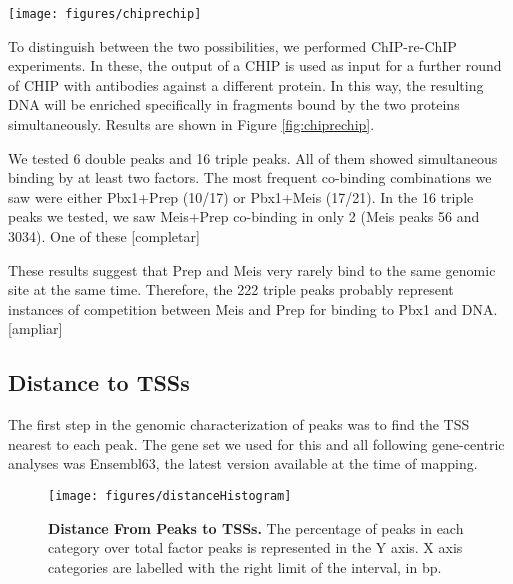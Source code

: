 \begin{SCfigure}[]
  \centering
  \texttt{[image: figures/chiprechip]}
  \caption[ChIP-re-ChIP experiments]{\textbf{ChIP-re-ChIP experiments.} Factors were subjected to succesive round of \ac{CHIP} with antibodies with different specificities, as indicated. Unspecific antibody (IgG) was used as a negative control. Purified DNA was amplified in a rate-limiting \ac{PCR} to obtain an amount of product roughly proportional to the peak DNA present. Band intensities over IgG band were considered as positive signals.}
  \label{fig:chiprechip}
\end{SCfigure}

To distinguish between the two possibilities, we performed ChIP-re-ChIP experiments. In these, the output of a \ac{CHIP} is used as input for a further round of \ac{CHIP} with antibodies against a different protein. In this way, the resulting DNA will be enriched specifically in fragments bound by the two proteins simultaneously. Results are shown in Figure \ref{fig:chiprechip}.

We tested 6 double peaks and 16 triple peaks. All of them showed simultaneous binding by at least two factors. The most frequent co-binding combinations we saw were either Pbx1+Prep (10/17) or Pbx1+Meis (17/21). In the 16 triple peaks we tested, we saw Meis+Prep co-binding in only 2 (Meis peaks 56 and 3034). One of these [completar]

These results suggest that Prep and Meis very rarely bind to the same genomic site at the same time. Therefore, the 222 triple peaks probably represent instances of competition between Meis and Prep for binding to Pbx1 and DNA. [ampliar]


\subsection{Distance to TSSs}

The first step in the genomic characterization of peaks was to find the \ac{TSS} nearest to each peak. The gene set we used for this and all following gene-centric analyses was Ensembl63, the latest version available at the time of mapping.

\begin{figure}[]
  
  \centering
  \texttt{[image: figures/distanceHistogram]}
  \caption[Distance From Peaks to \ac{TSS}s]{\textbf{Distance From Peaks to \ac{TSS}s.} The percentage of peaks in each category over total factor peaks is represented in the Y axis. X axis categories are labelled with the right limit of the interval, in \ac{bp}.}
  \label{fig:distanceHistogram}
\end{figure}

